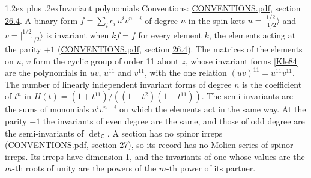 \documentclass[10pt,a4paper]{article}
\makeatletter
\renewcommand\section{\@startsection{section}{1}{\z@}{-3ex plus -1ex minus -.2ex}%
  {1.2ex plus .2ex}{\normalfont\large\sffamily\bfseries\color{parttitle}}}
\numberwithin{equation}{section}
\newcommand{\grp}[1]{\mathsf{#1}}
\newcommand{\jm}[2]{\bigl\lvert{}^{#1}_{\,#2}\bigr\rangle}
\makeatother
\begin{document}
\section{Invariant polynomials}\label{s:invariants}
Conventions: \href{../../CONVENTIONS.pdf}{CONVENTIONS.pdf}, section \href{../../CONVENTIONS.pdf\#conv.26.4}{26.4}.
\leavevmode\label{n:local.spinor.uv}\label{n:local.binary.form}A binary form $f = \sum_i c_i\, u^i v^{n-i}$ of degree $n$ in the spin kets $u = \jm{1/2}{1/2}$ and $v = \jm{1/2}{-1/2}$ is invariant when $k f = f$ for every element $k$, the elements acting at the parity $+1$ (\href{../../CONVENTIONS.pdf}{CONVENTIONS.pdf}, section \href{../../CONVENTIONS.pdf\#conv.26.4}{26.4}).
The matrices of the elements on $u$, $v$ form the cyclic group of order 11 about $z$, whose invariant forms [\href{../../../REFERENCES.pdf\#ref.Kle84}{Kle84}] are the polynomials in $uv$, $u^{11}$ and $v^{11}$, with the one relation $(uv)^{11} = u^{11}v^{11}$. \label{n:function.hilbert}The number of linearly independent invariant forms of degree $n$ is the coefficient of $t^n$ in $H(t) = (1 + t^{11})/((1-t^{2})(1-t^{11}))$. The semi-invariants are the sums of monomials $u^i v^{n-i}$ on which the elements act in the same way. At the parity $-1$ the invariants of even degree are the same, and those of odd degree are the semi-invariants of $\det_{\grp{G}}$. A section has no spinor irreps (\href{../../CONVENTIONS.pdf}{CONVENTIONS.pdf}, section \href{../../CONVENTIONS.pdf\#conv.27}{27}), so its record has no Molien series of spinor irreps. Its irreps have dimension 1, and the invariants of one whose values are the $m$-th roots of unity are the powers of the $m$-th power of its partner.
\end{document}
